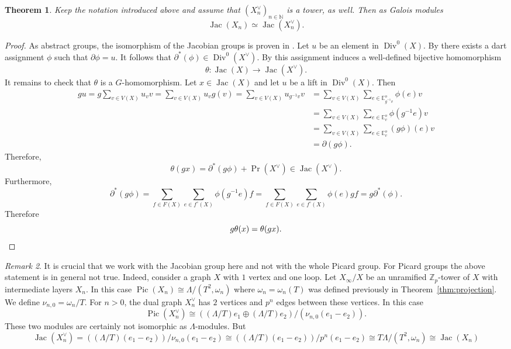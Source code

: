 \documentclass{amsart}
\newtheorem{theorem}{Theorem}[section]
\numberwithin{equation}{section}
\theoremstyle{remark}
\newtheorem{remark}[theorem]{Remark}
\newcommand{\Div}{\operatorname{Div}}
\newcommand{\Jac}{\operatorname{Jac}}
\newcommand{\Pic}{\operatorname{Pic}}
\newcommand{\Z}{\mathbb{Z}}
\newcommand{\E}{\mathbb{E}}
\theoremstyle{plain} %
\begin{document}
\begin{theorem}
\label{Jac are isom}
Keep the notation introduced above and assume that $(X_n^\vee)_{n\in \mathbb{N}}$ is a tower, as well.
Then as Galois modules 
\[
\Jac(X_n) \simeq \Jac(X_n^\vee).
\]
\end{theorem}
    
\begin{proof}
As abstract groups, the isomorphism of the Jacobian groups is proven in \cite[Theorem~2]{cori2000sandpile}.
Let $u$ be an element in ${\Div}^0(X)$.
By \cite[Proposition~3.2]{cori2000sandpile} there exists a dart assignment ${\phi}$ such that $\partial {\phi} =u$.
It follows that $\partial^*({\phi})\in {\Div}^0(X^\vee)$.
By \cite[proof of Theorem~2]{cori2000sandpile} this assignment induces a well-defined bijective homomorphism
\[
\theta\colon {\Jac}(X)\longrightarrow {\Jac}(X^\vee).
\]
It remains to check that $\theta$ is a $G$-homomorphism.
Let $x\in \Jac(X)$ and let $u$ be a lift in ${\Div}^0(X)$.
Then
\begin{align*}
g u=g\sum_{v\in V(X)} u_vv=\sum_{v\in V(X)}u_vg(v)=\sum_{v\in V(X)}u_{g^{-1}v}v & =\sum_{v\in V(X)}\sum_{e\in \E^o_{g^{-1}v}}{\phi}(e)v\\
&=\sum_{v\in V(X)}\sum_{e\in \E^o_v}{\phi}(g^{-1}e)v\\
& =\sum_{v\in V(X)}\sum_{e\in \E^o_v}(g{\phi})(e)v\\
& = \partial(g{\phi}).
\end{align*}
Therefore,
\[
\theta(gx)=\partial^*(g{\phi})+\Pr(X^\vee)\in {\Jac}(X^\vee).
\]
Furthermore,
\[
\partial^*(g{\phi})=\sum_{f\in F(X)}\sum_{e\in f^\circ(X)}{\phi}(g^{-1}e)f=\sum_{f\in F(X)}\sum_{e\in f^\circ(X)}{\phi}(e)gf=g\partial^*({\phi}).
\]
Therefore
\[
g\theta(x)=\theta(gx). \qedhere
\] 
\end{proof}

\begin{remark}
It is crucial that we work with the Jacobian group here and not with the whole Picard group.
For Picard groups the above statement is in general not true.
Indeed, consider a  graph $X$ with $1$ vertex and one loop. Let $X_\infty/X$ be an unramified $\Z_p$-tower of $X$ with intermediate layers $X_n$.
In this case $\Pic(X_n)\cong \Lambda/(T^2,\omega_n)$ where $\omega_n {= \omega_n(T)}$ was defined previously in Theorem~\ref{thm:projection}.
{We define $\nu_{n,0}=\omega_n/T$.}
For $n>0$, the dual graph $X_n^\vee$ has $2$ vertices and $p^n$ edges between these vertices.
In this case 
\[
\Pic(X_n^\vee)\cong \left((\Lambda/T)e_1\oplus(\Lambda/T)e_2\right)/(\nu_{n,0}(e_1-e_2)).
\]
These two modules are certainly not isomorphic as $\Lambda$-modules. But
\[\Jac(X_n^\vee)=\left((\Lambda/T)(e_1-e_2)\right)/\nu_{n,0}(e_1-e_2)\cong\left((\Lambda/T)(e_1-e_2)\right)/p^n(e_1-e_2)\cong T\Lambda/(T^2,\omega_n)\cong \Jac(X_n) \]
\end{remark}
\end{document}
